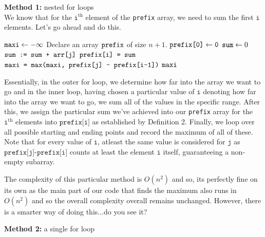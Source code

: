 \noindent \textbf{Method 1:} nested for loops \\ 

\noindent We know that for the $\texttt{i}^\text{th}$ element of the \texttt{prefix} array, we need to sum the first $\texttt{i}$ elements. Let's go ahead and do this.

\begin{algorithm}
\caption{}\label{prefix}
\begin{algorithmic}[1]
\State $\texttt{maxi} \gets -\infty$ 
\State Declare an array $\texttt{prefix}$ of size $n+1$.
\State $\texttt{prefix[0]} \gets \texttt{0}$ 
    \State $\texttt{sum} \gets 0$
        \State $\texttt{sum := sum + arr[j]}$
    \EndFor
    \State $\texttt{prefix[i] = sum}$
\EndFor
{}
        \State $\texttt{maxi = max(maxi, prefix[j] - prefix[i-1])}$
    \EndFor
\EndFor 
\State \Return $\texttt{maxi}$
\end{algorithmic}
\end{algorithm}

\noindent Essentially, in the outer for loop, we determine how far into the array we want to go and in the inner loop, having chosen a particular value of $\texttt{i}$ denoting how far into the array we want to go, we sum all of the values in the specific range. After this, we assign the particular sum we've achieved into our \texttt{prefix} array for the $\texttt{i}^\text{th}$ elements into $\texttt{prefix[i]}$ as established by Definition 2. Finally, we loop over all possible starting and ending points and record the maximum of all of these. Note that for every value of $\texttt{i}$, atleast the same value is considered for $\texttt{j}$ as $\texttt{prefix[j]-prefix[i]}$ counts at least the element $\texttt{i}$ itself, guaranteeing a non-empty subarray. \newline

\noindent The complexity of this particular method is $O(n^2)$ and so, its perfectly fine on its own as the main part of our code that finds the maximum also runs in $O(n^2)$ and so the overall complexity overall remains unchanged. However, there is a smarter way of doing this...do you see it? \newline

\noindent \textbf{Method 2:} a single for loop \\ 

